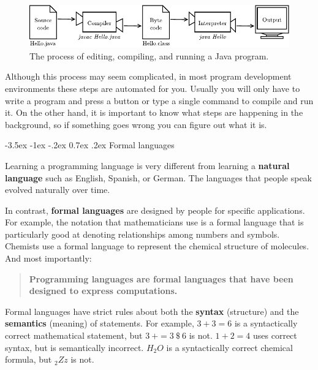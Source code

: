 \documentclass[12pt]{book}
\makeatletter
\theoremstyle{exercise}
\renewcommand{\section}{\@startsection{section}{1}{\z@}%
    {-3.5ex \@plus -1ex \@minus -.2ex}%
    {0.7ex \@plus.2ex}%
    {\normalfont\Large\bfseries}}
\makeatother
\begin{document}
\begin{figure}[!h]
\begin{center}
\includegraphics{figs/compiler.pdf}
\caption{The process of editing, compiling, and running a Java program.}
\end{center}
\end{figure}

Although this process may seem complicated, in most program development environments these steps are automated for you.
Usually you will only have to write a program and press a button or type a single command to compile and run it.
On the other hand, it is important to know what steps are happening in the background, so if something goes wrong you can figure out what it is.


\section{Formal languages}


Learning a programming language is very different from learning a {\bf natural language} such as English, Spanish, or German.
The languages that people speak evolved naturally over time.


In contrast, {\bf formal languages} are designed by people for specific applications.
For example, the notation that mathematicians use is a formal language that is particularly good at denoting relationships among numbers and symbols.
Chemists use a formal language to represent the chemical structure of molecules.
And most importantly:


\begin{quote}
{\bf Programming languages are formal languages that have been designed to express computations.}
\end{quote}


Formal languages have strict rules about both the {\bf syntax} (structure) and the {\bf semantics} (meaning) of statements.
For example, $3 + 3 = 6$ is a syntactically correct mathematical statement, but $3\ + = 3\ \$\ 6$ is not.
$1 + 2 = 4$ uses correct syntax, but is semantically incorrect.
$H_2O$ is a syntactically correct chemical formula, but $_2Zz$ is not.
\end{document}
